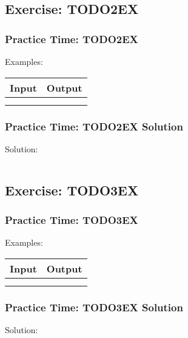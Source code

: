 \documentclass{beamer}
\begin{document}
\subsection{Exercise: TODO2EX}
\begin{frame}[fragile]
    \frametitle{Practice Time: TODO2EX}


    Examples:

    \begin{center}
        \begin{tabular}{|c|c|}
            \hline
            Input & Output  \\ \hline
                  &         \\ \hline
                  &         \\ \hline
        \end{tabular}
\end{center}
\end{frame}
\begin{frame}[fragile]
    \frametitle{Practice Time: TODO2EX Solution}

    Solution:
    \begin{verbatim}
    \end{verbatim}
\end{frame}

\subsection{Exercise: TODO3EX}
\begin{frame}[fragile]
    \frametitle{Practice Time: TODO3EX}


    Examples:

    \begin{center}
        \begin{tabular}{|c|c|}
            \hline
            Input & Output  \\ \hline
                  &         \\ \hline
                  &         \\ \hline
        \end{tabular}
\end{center}
\end{frame}
\begin{frame}[fragile]
    \frametitle{Practice Time: TODO3EX Solution}

    Solution:
    \begin{verbatim}
    \end{verbatim}
\end{frame}
\end{document}
